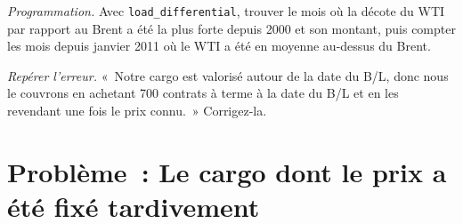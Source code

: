 \begin{exercise}[$\star\star\star$]\label{exo:m3:physical-commodity-markets:7}
\emph{Programmation.} Avec \texttt{load\_differential}, trouver le mois où la décote du WTI
par rapport au Brent a été la plus forte depuis 2000 et son montant, puis compter les mois depuis
janvier 2011 où le WTI a été en moyenne au-dessus du Brent.
\end{exercise}

\begin{exercise}[$\star\star\star$]\label{exo:m3:physical-commodity-markets:8}
\emph{Repérer l'erreur.} «~Notre cargo est valorisé autour de la date du B/L, donc nous le couvrons
en achetant 700 contrats à terme à la date du B/L et en les revendant une fois le prix connu.~»
Corrigez-la.
\end{exercise}

\section{Problème~: Le cargo dont le prix a été fixé tardivement}

